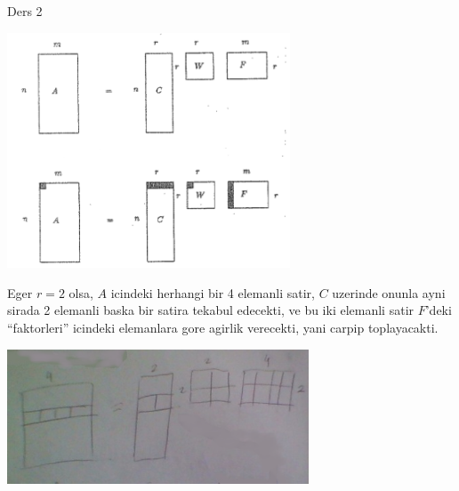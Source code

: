 \documentclass[12pt,fleqn]{article}\usepackage{../common}
\begin{document}
Ders 2

\includegraphics[height=7cm]{01.png}

Eger $r = 2$ olsa, $A$ icindeki herhangi bir 4 elemanli satir, $C$ uzerinde
onunla ayni sirada 2 elemanli baska bir satira tekabul edecekti, ve bu iki
elemanli satir $F$'deki ``faktorleri'' icindeki elemanlara gore agirlik
verecekti, yani carpip toplayacakti. 

\includegraphics[height=4cm]{02.png}
\end{document}
